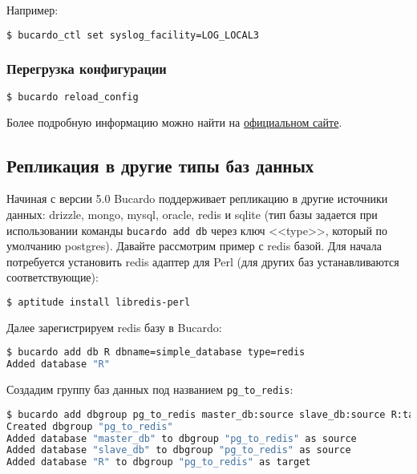 Например:

\begin{lstlisting}[language=Bash,label=lst:bucardo15,caption=Изменения значений конфигурации]
$ bucardo_ctl set syslog_facility=LOG_LOCAL3
\end{lstlisting}

\subsubsection{Перегрузка конфигурации}

\begin{lstlisting}[language=Bash,label=lst:bucardo16,caption=Перегрузка конфигурации]
$ bucardo reload_config
\end{lstlisting}

Более подробную информацию можно найти на \href{http://bucardo.org/}{официальном сайте}.


\subsection{Репликация в другие типы баз данных}

Начиная с версии 5.0 Bucardo поддерживает репликацию в другие источники данных: drizzle, mongo, mysql, oracle, redis и sqlite (тип базы задается при использовании команды \lstinline!bucardo add db! через ключ <<type>>, который по умолчанию postgres). Давайте рассмотрим пример с redis базой. Для начала потребуется установить redis адаптер для Perl (для других баз устанавливаются соответствующие):

\begin{lstlisting}[language=Bash,label=lst:bucardo-redis1,caption=Установка redis]
$ aptitude install libredis-perl
\end{lstlisting}

Далее зарегистрируем redis базу в Bucardo:

\begin{lstlisting}[language=Bash,label=lst:bucardo-redis2,caption=Добавление redis базы]
$ bucardo add db R dbname=simple_database type=redis
Added database "R"
\end{lstlisting}

Создадим группу баз данных под названием \lstinline!pg_to_redis!:

\begin{lstlisting}[language=Bash,label=lst:bucardo-redis3,caption=Группа баз данных]
$ bucardo add dbgroup pg_to_redis master_db:source slave_db:source R:target
Created dbgroup "pg_to_redis"
Added database "master_db" to dbgroup "pg_to_redis" as source
Added database "slave_db" to dbgroup "pg_to_redis" as source
Added database "R" to dbgroup "pg_to_redis" as target
\end{lstlisting}

